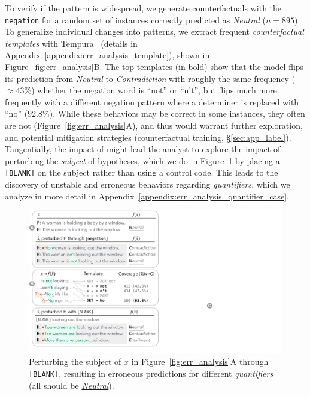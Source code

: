 To verify if the pattern is widespread, we generate counterfactuals with the \texttt{negation} \tagstr for a random set of instances correctly predicted as \emph{Neutral} ($n=895$). To generalize individual changes into patterns, we extract frequent \emph{counterfactual templates} with Tempura~\cite{wu2020tempura} (details in Appendix~\ref{appendix:err_analysis_template}), shown in Figure~\ref{fig:err_analysis}B.
The top templates (in bold) show that the model flips its prediction from \emph{Neutral} to \emph{Contradiction} with roughly the same frequency (${\approx}43\%$) whether the negation word is ``not'' or ``n't'', but flips much more frequently with a different negation pattern where a determiner is replaced with ``no'' ($92.8\%$). While these behaviors may be correct in some instances, they often are not (\eg Figure~\ref{fig:err_analysis}A), and thus would warrant further exploration, and potential mitigation strategies (\eg counterfactual training, \S\ref{sec:app_label}).
Tangentially, the impact of  might lead the analyst to explore the impact of perturbing the \emph{subject} of hypotheses, which we do in Figure~\ref{fig:err_analysis_quantifier} by placing a \texttt{[BLANK]} on the subject rather than using a control code.
This leads to the discovery of unstable and erroneous behaviors regarding \emph{quantifiers}, which we analyze in more detail in Appendix~\ref{appendix:err_analysis_quantifier_case}.




\begin{figure}[t]
\centering
\includegraphics[trim={0.5cm 1.5cm 32.5cm 25.5cm}, clip,width=1\columnwidth]{figures/err_analysis.pdf}
\vspace{-15pt}
\caption{
Perturbing the subject of $x$ in Figure~\ref{fig:err_analysis}A through \texttt{[BLANK]}, resulting in erroneous predictions for different \emph{quantifiers}
(all should be \uline{\emph{Neutral}}). 
}
\vspace{-15pt}
\label{fig:err_analysis_quantifier}
\end{figure}

